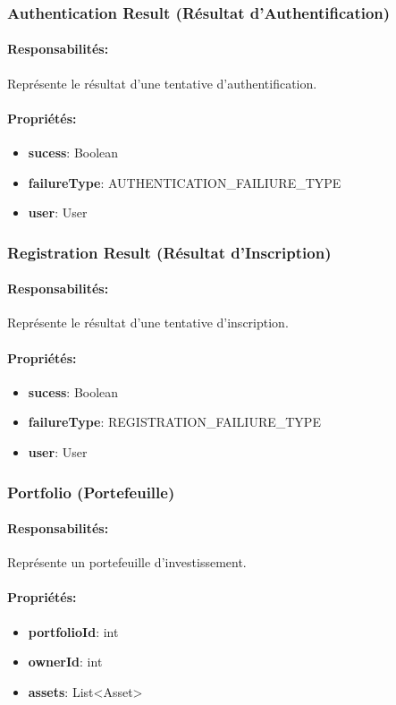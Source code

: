 \documentclass{article}
\begin{document}
\subsubsection{Authentication Result (Résultat d'Authentification)}
\paragraph{Responsabilités:} Représente le résultat d'une tentative d'authentification.
\paragraph{Propriétés:}
\begin{itemize}
  \item \textbf{sucess}: Boolean
  \item \textbf{failureType}: AUTHENTICATION\_FAILIURE\_TYPE
  \item \textbf{user}: User
\end{itemize}
\subsubsection{Registration Result (Résultat d'Inscription)}
\paragraph{Responsabilités:} Représente le résultat d'une tentative d'inscription.
\paragraph{Propriétés:}
\begin{itemize}
  \item \textbf{sucess}: Boolean
  \item \textbf{failureType}: REGISTRATION\_FAILIURE\_TYPE
  \item \textbf{user}: User
\end{itemize}
\subsubsection{Portfolio (Portefeuille)}
\paragraph{Responsabilités:} Représente un portefeuille d'investissement.
\paragraph{Propriétés:}
\begin{itemize}
  \item \textbf{portfolioId}: int
  \item \textbf{ownerId}: int
  \item \textbf{assets}: List<Asset>
\end{itemize}
\end{document}
